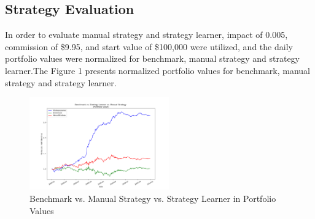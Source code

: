 \documentclass{amia}
\begin{document}
\subsection*{Strategy Evaluation}
In order to evaluate manual strategy and strategy learner, impact of 0.005, commission of \$9.95, and start value of \$100,000 were utilized, and the daily portfolio values were normalized for benchmark, manual strategy and strategy learner.The Figure 1 presents normalized portfolio values for benchmark, manual strategy and strategy learner. 
\vspace{-1mm}
\begin{figure}[H]
	\centering
	\includegraphics[height=4cm]{pics/exp1.png}
	\caption{Benchmark vs. Manual Strategy vs. Strategy Learner in Portfolio Values}
\end{figure}
\end{document}
